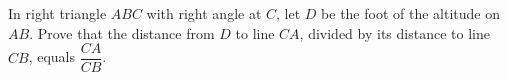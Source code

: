 In right triangle $ABC$ with right angle at $C$, let $D$ be the foot of the altitude on $AB$. Prove that the distance from $D$ to line $CA$, divided by its distance to line $CB$, equals $\dfrac{CA}{CB}$.
